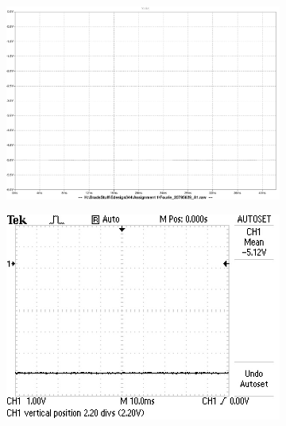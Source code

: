 \begin{figure}
\begin{subfigure}[]{0.35\textwidth}
      		\includegraphics[width=1.0\linewidth]{./Figures/pwr_simu_rails_neg.pdf}
		   \caption{ } \label{subfig:pwr_simu_rails_neg}
     \end{subfigure}
    \begin{subfigure}[]{0.35\textwidth}
             \centering
  		\includegraphics[width=1.0\linewidth]{./Figures/pwr_meas_rails_neg.JPG}
		   \caption{ } \label{subfig:pwr_meas_rails_neg}
     \end{subfigure}
    \begin{subfigure}[]{0.35\textwidth}
              \centering

\end{subfigure}
\end{figure}

